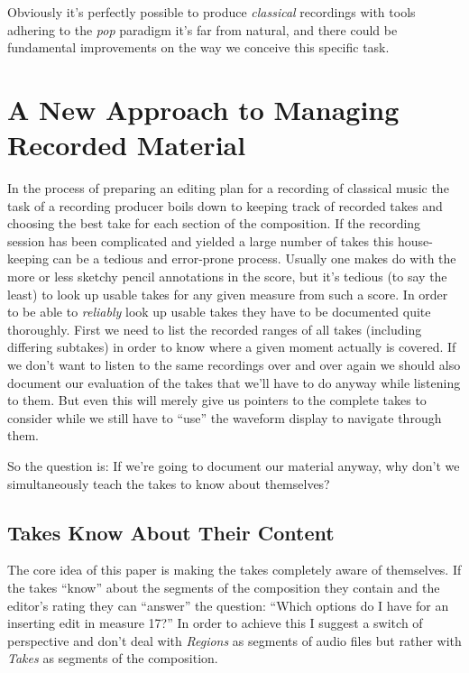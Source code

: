 \documentclass[11pt,a4paper]{article}
\begin{document}
Obviously it's perfectly possible to produce \emph{classical} recordings with tools adhering to the \emph{pop} paradigm it's far from natural, and there could be fundamental improvements on the way we conceive this specific task. 

\section{A New Approach to Managing Recorded Material}

In the process of preparing an editing plan for a recording of classical music the task of a recording producer boils down to keeping track of recorded takes and choosing the best take for each section of the composition.
If the recording session has been complicated and yielded a large number of takes this house-keeping can be a tedious and error-prone process.
Usually one makes do with the more or less sketchy pencil annotations in the score, but it's tedious (to say the least) to look up usable takes for any given measure from such a score.
In order to be able to \emph{reliably} look up usable takes they have to be documented quite thoroughly.
First we need to list the recorded ranges of all takes (including differing subtakes) in order to know where a given moment actually is covered.
If we don't want to listen to the same recordings over and over again we should also document our evaluation of the takes that we'll have to do anyway while listening to them.
But even this will merely give us pointers to the complete takes to consider while we still have to “use” the waveform display to navigate through them.

So the question is: If we're going to document our material anyway, why don't we simultaneously teach the takes to know about themselves?

\subsection{Takes Know About Their Content}

The core idea of this paper is making the takes completely aware of themselves.
If the takes “know” about the segments of the composition they contain and the editor's rating they can “answer” the question: “Which options do I have for an inserting edit in measure 17?”
In order to achieve this I suggest a switch of perspective and don't deal with \emph{Regions} as segments of audio files but rather with \emph{Takes} as segments of the composition.
\end{document}
